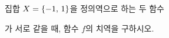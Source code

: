 \hspace*{2mm}\begin{minipage}[t]{\dimexpr\linewidth-2mm\relax}\vspace{0pt}
집합 $X=\{-1,\mkern3mu 1\}$을 정의역으로 하는 두 함수\par\smallskip{}\par\smallskip\noindent 가 서로 같을 때, 함수 $f$의 치역을 구하시오. \end{minipage}
